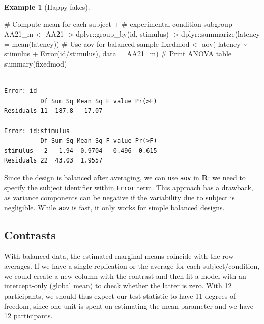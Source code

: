 \documentclass[
  11pt,
  letterpaper,
]{scrbook}
\newenvironment{Shaded}{\begin{snugshade}}{\end{snugshade}}
\newcommand{\AttributeTok}[1]{\textcolor[rgb]{0.40,0.45,0.13}{#1}}
\newcommand{\CommentTok}[1]{\textcolor[rgb]{0.37,0.37,0.37}{#1}}
\newcommand{\FunctionTok}[1]{\textcolor[rgb]{0.28,0.35,0.67}{#1}}
\newcommand{\NormalTok}[1]{\textcolor[rgb]{0.00,0.23,0.31}{#1}}
\newcommand{\OtherTok}[1]{\textcolor[rgb]{0.00,0.23,0.31}{#1}}
\newcommand{\SpecialCharTok}[1]{\textcolor[rgb]{0.37,0.37,0.37}{#1}}
\theoremstyle{definition}
\newtheorem{example}{Example}[chapter]
\theoremstyle{definition}
\theoremstyle{remark}
\begin{document}
\begin{example}[Happy
fakes]
\begin{Shaded}
\begin{Highlighting}[]
\CommentTok{\# Compute mean for each subject + }
\CommentTok{\# experimental condition subgroup}
\NormalTok{AA21\_m }\OtherTok{\textless{}{-}}\NormalTok{ AA21 }\SpecialCharTok{|\textgreater{}}
\NormalTok{  dplyr}\SpecialCharTok{::}\FunctionTok{group\_by}\NormalTok{(id, stimulus) }\SpecialCharTok{|\textgreater{}}
\NormalTok{  dplyr}\SpecialCharTok{::}\FunctionTok{summarize}\NormalTok{(}\AttributeTok{latency =} \FunctionTok{mean}\NormalTok{(latency))}
\CommentTok{\# Use aov for balanced sample}
\NormalTok{fixedmod }\OtherTok{\textless{}{-}} \FunctionTok{aov}\NormalTok{(}
\NormalTok{  latency }\SpecialCharTok{\textasciitilde{}}\NormalTok{ stimulus }\SpecialCharTok{+} \FunctionTok{Error}\NormalTok{(id}\SpecialCharTok{/}\NormalTok{stimulus), }
  \AttributeTok{data =}\NormalTok{ AA21\_m)}
\CommentTok{\# Print ANOVA table}
\FunctionTok{summary}\NormalTok{(fixedmod)}
\end{Highlighting}
\end{Shaded}

\begin{verbatim}

Error: id
          Df Sum Sq Mean Sq F value Pr(>F)
Residuals 11  187.8   17.07               

Error: id:stimulus
          Df Sum Sq Mean Sq F value Pr(>F)
stimulus   2   1.94  0.9704   0.496  0.615
Residuals 22  43.03  1.9557               
\end{verbatim}

Since the design is balanced after averaging, we can use \texttt{aov} in
\textbf{R}: we need to specify the subject identifier within
\texttt{Error} term. This approach has a drawback, as variance
components can be negative if the variability due to subject is
negligible. While \texttt{aov} is fast, it only works for simple
balanced designs.

\end{example}

\subsection{Contrasts}\label{contrasts-1}

With balanced data, the estimated marginal means coincide with the row
averages. If we have a single replication or the average for each
subject/condition, we could create a new column with the contrast and
then fit a model with an intercept-only (global mean) to check whether
the latter is zero. With 12 participants, we should thus expect our test
statistic to have 11 degrees of freedom, since one unit is spent on
estimating the mean parameter and we have 12 participants.
\end{document}
